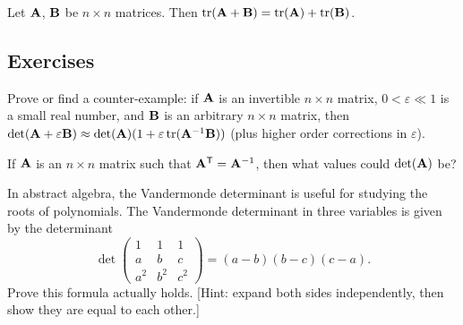\begin{proposition}
Let $\mathbf{A}$, $\mathbf{B}$ be $n\times n$ matrices.
Then $\mathop{\rm tr}\nolimits(\mathbf{A} + \mathbf{B}) = \mathop{\rm tr}\nolimits(\mathbf{A}) + \mathop{\rm tr}\nolimits(\mathbf{B})$.
\end{proposition}


\subsection*{Exercises}

\begin{exercise}
Prove or find a counter-example: if $\mathbf{A}$ is an invertible $n\times n$
matrix, $0<\varepsilon\ll1$ is a small real number, and $\mathbf{B}$ is an
arbitrary $n\times n$ matrix, then
$\det(\mathbf{A} + \varepsilon\mathbf{B})\approx \det(\mathbf{A})(1 + \varepsilon\mathop{\rm tr}\nolimits(\mathbf{A}^{-1}\mathbf{B}))$
(plus higher order corrections in $\varepsilon$).
\end{exercise}

\begin{exercise}
If $\mathbf{A}$ is an $n\times n$ matrix such that $\mathbf{A}^{\mathsf{T}}=\mathbf{A}^{-1}$,
then what values could $\det(\mathbf{A})$ be?
\end{exercise}

\begin{exercise}
In abstract algebra, the Vandermonde determinant is useful for studying
the roots of polynomials. The Vandermonde determinant in three variables
is given by the determinant
\[ \det\begin{pmatrix}
1     & 1     & 1 \\
a     & b     & c\\
a^{2} & b^{2} & c^{2}
\end{pmatrix}=(a-b)(b-c)(c-a). \]
Prove this formula actually holds. [Hint: expand both sides
  independently, then show they are equal to each other.]
\end{exercise}